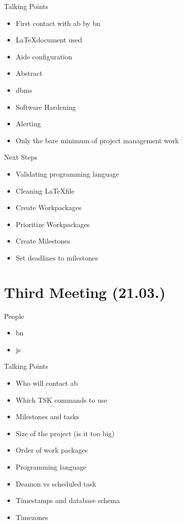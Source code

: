 Talking Points
\begin{itemize}
    \item First contact with \gls{ab} by \gls{bn}
    \item \LaTeX document used
    \item Aide configuration
    \item Abstract
    \item \gls{dbms}
    \item Software Hardening
    \item Alerting
    \item Only the bare minimum of project management work
\end{itemize}

Next Steps
\begin{itemize}
    \item Validating programming language
    \item Cleaning \LaTeX file
    \item Create Workpackages
    \item Prioritize Workpackages 
    \item Create Milestones
    \item Set deadlines to milestones
\end{itemize}

\section{Third Meeting (21.03.)}
\label{sec:meeting03}

People
\begin{itemize}
    \item \gls{bn}
    \item \gls{js}
\end{itemize}

Talking Points
\begin{itemize}
    \item Who will contact \gls{ab}
    \item Which TSK commands to use
    \item Milestones and tasks
    \item Size of the project (is it too big)
    \item Order of work packages
    \item Programming language
    \item Deamon vs scheduled task
    \item Timestamps and database schema
    \item Timezones
\end{itemize}


